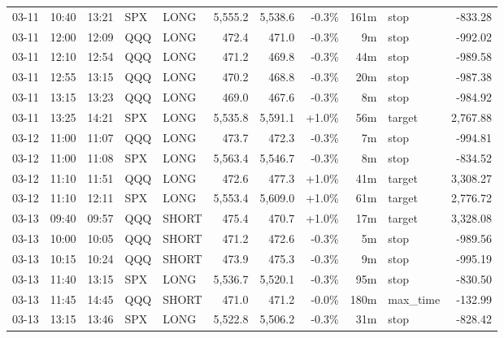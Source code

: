 \documentclass[11pt,a4paper,twoside]{article}
\begin{document}
\begin{center}
\begin{longtable}{>{\color{txtmain}}l l l l l r r r r >{\color{txtmain}}l r}
03-11 & 10:40 & 13:21 & SPX & LONG & 5,555.2 & 5,538.6 & \textcolor{lossred}{-0.3\%} & 161m & stop & \textcolor{lossred}{-833.28} \\
03-11 & 12:00 & 12:09 & QQQ & LONG & 472.4 & 471.0 & \textcolor{lossred}{-0.3\%} & 9m & stop & \textcolor{lossred}{-992.02} \\
03-11 & 12:10 & 12:54 & QQQ & LONG & 471.2 & 469.8 & \textcolor{lossred}{-0.3\%} & 44m & stop & \textcolor{lossred}{-989.58} \\
03-11 & 12:55 & 13:15 & QQQ & LONG & 470.2 & 468.8 & \textcolor{lossred}{-0.3\%} & 20m & stop & \textcolor{lossred}{-987.38} \\
03-11 & 13:15 & 13:23 & QQQ & LONG & 469.0 & 467.6 & \textcolor{lossred}{-0.3\%} & 8m & stop & \textcolor{lossred}{-984.92} \\
03-11 & 13:25 & 14:21 & SPX & LONG & 5,535.8 & 5,591.1 & \textcolor{wingreen}{+1.0\%} & 56m & target & \textcolor{wingreen}{2,767.88} \\
03-12 & 11:00 & 11:07 & QQQ & LONG & 473.7 & 472.3 & \textcolor{lossred}{-0.3\%} & 7m & stop & \textcolor{lossred}{-994.81} \\
03-12 & 11:00 & 11:08 & SPX & LONG & 5,563.4 & 5,546.7 & \textcolor{lossred}{-0.3\%} & 8m & stop & \textcolor{lossred}{-834.52} \\
03-12 & 11:10 & 11:51 & QQQ & LONG & 472.6 & 477.3 & \textcolor{wingreen}{+1.0\%} & 41m & target & \textcolor{wingreen}{3,308.27} \\
03-12 & 11:10 & 12:11 & SPX & LONG & 5,553.4 & 5,609.0 & \textcolor{wingreen}{+1.0\%} & 61m & target & \textcolor{wingreen}{2,776.72} \\
03-13 & 09:40 & 09:57 & QQQ & SHORT & 475.4 & 470.7 & \textcolor{wingreen}{+1.0\%} & 17m & target & \textcolor{wingreen}{3,328.08} \\
03-13 & 10:00 & 10:05 & QQQ & SHORT & 471.2 & 472.6 & \textcolor{lossred}{-0.3\%} & 5m & stop & \textcolor{lossred}{-989.56} \\
03-13 & 10:15 & 10:24 & QQQ & SHORT & 473.9 & 475.3 & \textcolor{lossred}{-0.3\%} & 9m & stop & \textcolor{lossred}{-995.19} \\
03-13 & 11:40 & 13:15 & SPX & LONG & 5,536.7 & 5,520.1 & \textcolor{lossred}{-0.3\%} & 95m & stop & \textcolor{lossred}{-830.50} \\
03-13 & 11:45 & 14:45 & QQQ & SHORT & 471.0 & 471.2 & \textcolor{lossred}{-0.0\%} & 180m & max\_time & \textcolor{lossred}{-132.99} \\
03-13 & 13:15 & 13:46 & SPX & LONG & 5,522.8 & 5,506.2 & \textcolor{lossred}{-0.3\%} & 31m & stop & \textcolor{lossred}{-828.42} \\

\end{longtable}
\end{center}
\end{document}
